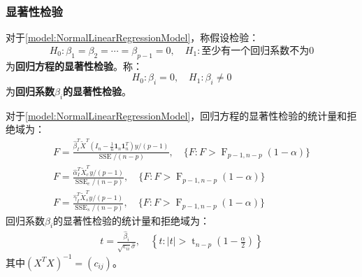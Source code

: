 \subsubsection{显著性检验}
\begin{definition}
	对于\cref{model:NormalLinearRegressionModel}，称假设检验：
	\begin{equation*}
		H_0:\beta_1=\beta_2=\cdots=\beta_{p-1}=0,\quad H_1:\text{至少有一个回归系数不为}0
	\end{equation*}
	为\textbf{回归方程的显著性检验}。称：
	\begin{equation*}
		H_0:\beta_i=0,\quad H_1:\beta_i\ne0
	\end{equation*}
	为\textbf{回归系数$\beta_i$的显著性检验}。
\end{definition}
\begin{theorem}\label{theo:LinearRegressionModelTSH}
	对于\cref{model:NormalLinearRegressionModel}，回归方程的显著性检验的统计量和拒绝域为：
	\begin{gather*}
		F=\frac{\hat{\beta}_I^T\tilde{X}^T\left(I_n-\frac{1}{n}\mathbf{1}_n\mathbf{1}_n^T\right)y/(p-1)}{\operatorname{SSE}/(n-p)},\quad \{F:F>\operatorname{F}_{p-1,n-p}(1-\alpha)\} \\
		F=\frac{\hat{\alpha}_I^T\tilde{X}_c^Ty/(p-1)}{\operatorname{SSE}_c/(n-p)},\quad \{F:F>\operatorname{F}_{p-1,n-p}(1-\alpha)\} \\
		F=\frac{\hat{\gamma}_I^T\tilde{X}_s^Ty/(p-1)}{\operatorname{SSE}_s/(n-p)},\quad \{F:F>\operatorname{F}_{p-1,n-p}(1-\alpha)\}
	\end{gather*}
	回归系数$\beta_i$的显著性检验的统计量和拒绝域为：
	\begin{gather*}
		t=\frac{\hat{\beta}_i}{\sqrt{c_{ii}}\hat{\sigma}},\quad\left\{t:|t|>\operatorname{t}_{n-p}\left(1-\frac{\alpha}{2}\right)\right\}
	\end{gather*}
	其中$(X^TX)^{-1}=(c_{ij})$。
\end{theorem}
